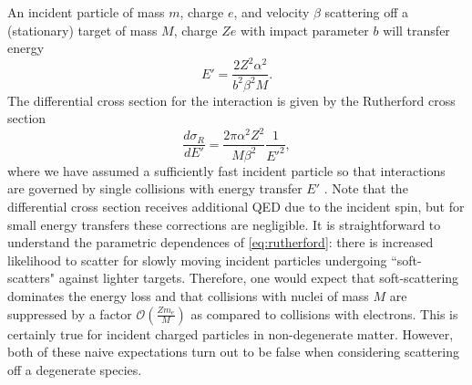 \documentclass[twocolumn,showpacs,preprintnumbers,amsmath,amssymb,prd]{revtex4}
\newcommand{\OO}{\mathcal{O}}
\def\r{\right)}
\def\l{\left(}
\begin{document}
\begin{appendices}
An incident particle of mass $m$, charge $e$, and velocity $\beta$ scattering off a (stationary) target of mass $M$, charge $Ze$ with impact parameter $b$ will transfer energy
\begin{equation}
\label{eq:impact}
E' = \frac{2 Z^2 \alpha^2}{b^2 \beta ^2 M}.
\end{equation}
The differential cross section for the interaction is given by the Rutherford cross section
\begin{equation}
\label{eq:rutherford}
\frac{d \sigma_R}{dE'} = \frac{2 \pi  \alpha^2 Z^2}{M \beta^2} \frac{1}{E'^2},
 \end{equation}
where we have assumed a sufficiently fast incident particle so that interactions are governed by single collisions with energy transfer $E'$ \cite{Agashe:2014kda}.  Note that the differential cross section receives additional QED due to the incident spin, but for small energy transfers these corrections are negligible. It is straightforward to understand the parametric dependences of \eqref{eq:rutherford}: there is increased likelihood to scatter for slowly moving incident particles undergoing ``soft-scatters" against lighter targets. Therefore, one would expect that soft-scattering dominates the energy loss and that collisions with nuclei of mass $M$ are suppressed by a factor $\OO\l\frac{Z m_e}{M}\r$ as compared to collisions with electrons. This is certainly true for incident charged particles in non-degenerate matter. However, both of these naive expectations turn out to be false when considering scattering off a degenerate species.


\end{appendices}
\end{document}
